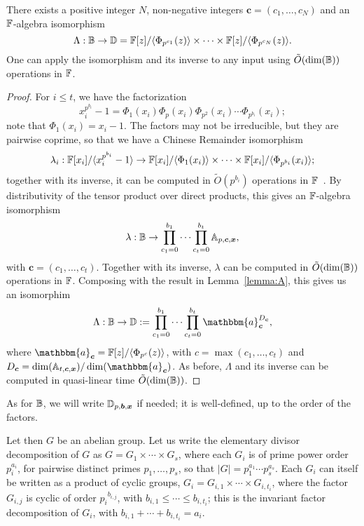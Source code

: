 \begin{lemma}\label{lemma:alg}
  There exists a positive integer $N$, non-negative integers
  $\boldsymbol{c}=(c_1,\dots,c_N)$ and  an
  $\mathbb{F}$-algebra isomorphism 
  $$\Lambda: \mathbb{B} \to \mathbb{D}= \mathbb{F}[z]/\langle \Phi_{p^{c_1}}(z) \rangle \times \cdots \times \mathbb{F}[z]/\langle \Phi_{p^{c_N}}(z)\rangle.$$
  One can apply the isomorphism and its inverse to any 
  input using $\tilde{O}(\dim(\mathbb{B}))$ operations in $\mathbb{F}$.
\end{lemma}
\begin{proof}
For $i \le t$, we have the factorization
$$x_i^{p^{b_i}}-1 = \Phi_1(x_i) \Phi_p(x_i) \Phi_{p^2}(x_i) \cdots
\Phi_{p^{b_i}}(x_i);$$ note that $\Phi_1(x_i)=x_i-1$.  The factors may
not be irreducible, but they are pairwise coprime, so that we have a
Chinese Remainder isomorphism
$$\lambda_i: \mathbb{F}[x_i]/\langle x_i^{p^{b_i}}-1 \rangle \to \mathbb{F}[x_i]/\langle \Phi_1(x_i)\rangle
\times \cdots \times  \mathbb{F}[x_i]/\langle \Phi_{p^{b_i}}(x_i)\rangle;$$
together with its inverse, it can be computed  
in $\tilde{O}(p^{b_i})$ operations in $\mathbb{F}$~\cite[Chapter~10]{vzGathen13}. By distributivity of the tensor
product over direct products, 
this gives an $\mathbb{F}$-algebra isomorphism
$$\lambda: \mathbb{B} \to \prod_{c_1=0}^{b_1} \cdots \prod_{c_t=0}^{b_t} \mathbb{A}_{p,\boldsymbol{c},\boldsymbol{x}},$$
with $\boldsymbol{c}=(c_1,\dots,c_t)$. Together with its inverse, 
$\lambda$ can be computed in $\tilde{O}(\dim(\mathbb{B}))$ operations in $\mathbb{F}$.
Composing with the result in Lemma~\ref{lemma:A}, this gives
us an isomorphim
$$\Lambda: \B \to \D:=\prod_{c_1=0}^{b_1} \cdots \prod_{c_t=0}^{b_t}
\mathbbm{a}_{\boldsymbol{c}}^{D_{\boldsymbol{c}}},$$ where
$\mathbbm{a}_{\boldsymbol{c}} = \F[z]/\langle \Phi_{p^c}(z)\rangle$,
with $c =\max(c_1,\dots,c_t)$ and $D_{\boldsymbol{c}} =
\dim(\A_{t,\boldsymbol{c},\boldsymbol{x}})/\dim(\mathbbm{a}_{\boldsymbol{c}})$. As
before, $\Lambda$ and its inverse can be computed in quasi-linear time
$\tilde{O}(\dim(\mathbb{B}))$.
\end{proof}
As for $\mathbb{B}$, we will write $\mathbb{D}_{p,\boldsymbol{b},\boldsymbol{x}}$ if needed; it is
well-defined, up to the order of the factors.

\smallskip

 Let then $G$ be an abelian group.  Let us
write the elementary divisor decomposition of $G$ as $G = G_1 \times
\cdots \times G_s$, where each $G_i$ is of prime power order
$p_i^{a_i}$, for pairwise distinct primes $p_1,\dots,p_s$, so that
$|G| = p_1^{a_1} \cdots p_s^{a_s}$. Each $G_i$ can itself be written
as a product of cyclic groups, $G_i = G_{i,1} \times \cdots \times
G_{i,t_i}$, where the factor $G_{i,j}$ is cyclic of order
${p_i}^{b_{i,j}}$, with $b_{i,1} \le \cdots \le b_{i,t_i}$; this is
the invariant factor decomposition of $G_i$, with $b_{i,1} + \cdots +
b_{i,t_i} = a_i$.

